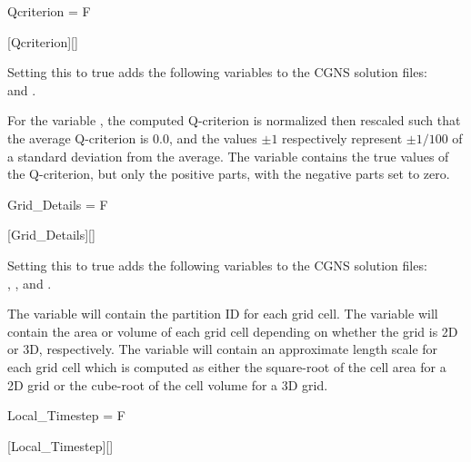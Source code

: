 
\begin{nmldescitem}
Qcriterion = F
\end{nmldescitem}
[Qcriterion][]

\begin{nmldescbody}
Setting this to true adds the following variables to the CGNS solution files:
\\
   and
  .

For the variable , the computed Q-criterion is
normalized then rescaled such that the average Q-criterion is 0.0,
and the values $\pm 1$ respectively represent $\pm 1/100$ of a
standard deviation from the average.
%
The variable  contains the true values
of the Q-criterion, but only the positive parts, with the
negative parts set to zero.
\end{nmldescbody}


\begin{nmldescitem}
Grid_Details = F
\end{nmldescitem}
[Grid\_Details][]

\begin{nmldescbody}
Setting this to true adds the following variables to the CGNS solution files:
\\
  ,
  , and
  .

The variable  will contain the partition ID for each grid cell.
%
The variable  will contain the area or volume of each grid
cell depending on whether the grid is 2D or 3D, respectively.
%
The variable  will contain an approximate length scale for
each grid cell which is computed as either the square-root of the cell area
for a 2D grid or the cube-root of the cell volume for a 3D grid.
\end{nmldescbody}


\begin{nmldescitem}
Local_Timestep = F
\end{nmldescitem}
[Local\_Timestep][]

